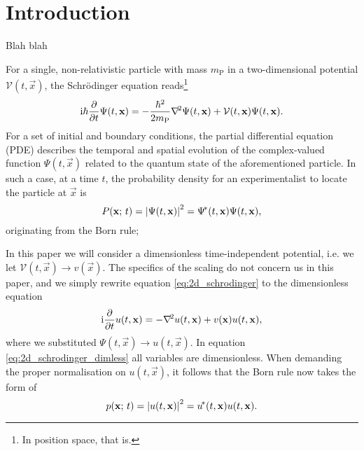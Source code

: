 \section{Introduction}\label{sec:introduction}


Blah blah 





For a single, non-relativistic particle with mass $m_\mathrm{P}$ in a two-dimensional potential $\mathcal{V}(t, \vec{x})$, the Schrödinger equation reads\footnote{In position space, that is. }
\begin{equation}\label{eq:2d_schrodinger}
    \mathrm{i} \hbar \pdv{}{t}\Psi(t, \mathbf{x}) = -\frac{\hbar^2}{2m_\mathrm{P}}\nabla^{\!2} \Psi(t, \mathbf{x})  + \mathcal{V}(t, \mathbf{x}) \Psi(t, \mathbf{x}).
\end{equation}
For a set of initial and boundary conditions, the partial differential equation (PDE) describes the temporal and spatial evolution of the complex-valued function $\Psi(t, \vec{x})$ related to the quantum state of the aforementioned particle. In such a case, at a time $t$, the probability density for an experimentalist to locate the particle at $\vec{x}$  is
\begin{equation}\label{eq:2d_bornrule}
    P(\mathbf{x}; \, t) = \abs{\Psi(t, \mathbf{x})}^2 = \Psi^{\!*}(t, \mathbf{x}) \Psi(t, \mathbf{x}),
\end{equation} 
originating from the Born rule; 

In this paper we will consider a dimensionless time-independent potential, i.e. we let $\mathcal{V}(t, \vec{x}) \to v(\vec{x})$. The specifics of the scaling do not concern us in this paper, and we simply rewrite equation \eqref{eq:2d_schrodinger} to the dimensionless equation
\begin{equation}\label{eq:2d_schrodinger_dimless}
    \mathrm{i} \pdv{}{t}u(t, \mathbf{x}) = - \nabla^{\!2}u(t, \mathbf{x})+ v(\mathbf{x})u(t, \mathbf{x}),
\end{equation}
where we substituted $\Psi(t, \vec{x}) \to u(t, \vec{x})$. In equation \eqref{eq:2d_schrodinger_dimless} all variables are dimensionless. When demanding the proper normalisation on $u(t,\vec{x})$, it follows that the Born rule now takes the form of
\begin{equation}\label{eq:2d_bornrule_dimless}
    p(\mathbf{x}; \, t) = \abs{u(t, \mathbf{x})}^2 = u^{\!*} (t, \mathbf{x})u(t, \mathbf{x}).
\end{equation}


